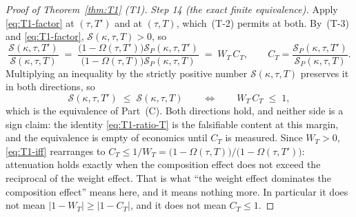 \documentclass[11pt]{article}
\begin{document}
\begin{proof}[Proof of Theorem~\ref{thm:T1} (T1)]
\emph{Step 14 (the exact finite equivalence).} Apply \eqref{eq:T1-factor} at $(\tau,T')$ and at
$(\tau,T)$, which~(T-2) permits at both. By~(T-3) and \eqref{eq:T1-factor},
$\mathcal S(\kappa,\tau,T) > 0$, so
\begin{equation}
\label{eq:T1-ratio-T}
\frac{\mathcal S(\kappa,\tau,T')}{\mathcal S(\kappa,\tau,T)}
\;=\; \frac{\bigl(1-\Omega(\tau,T')\bigr)\mathcal S_P(\kappa,\tau,T')}
            {\bigl(1-\Omega(\tau,T)\bigr)\mathcal S_P(\kappa,\tau,T)}
\;=\; W_T\,C_T,
\qquad
C_T = \frac{\mathcal S_P(\kappa,\tau,T')}{\mathcal S_P(\kappa,\tau,T)} .
\end{equation}
Multiplying an inequality by the strictly positive number $\mathcal S(\kappa,\tau,T)$ preserves it
in both directions, so
\begin{equation}
\label{eq:T1-iff}
\mathcal S(\kappa,\tau,T') \;\le\; \mathcal S(\kappa,\tau,T)
\qquad\Longleftrightarrow\qquad
W_T\,C_T \;\le\; 1 ,
\end{equation}
which is the equivalence of Part~(C). Both directions hold, and neither side is a sign claim: the
identity \eqref{eq:T1-ratio-T} is the falsifiable content at this margin, and the equivalence is
empty of economics until $C_T$ is measured. Since $W_T > 0$, \eqref{eq:T1-iff} rearranges to
$C_T \le 1/W_T = \bigl(1-\Omega(\tau,T)\bigr)/\bigl(1-\Omega(\tau,T')\bigr)$: attenuation holds
exactly when the composition effect does not exceed the reciprocal of the weight effect. That is
what ``the weight effect dominates the composition effect'' means here, and it means nothing more.
In particular it does not mean $\lvert 1-W_T\rvert \ge \lvert 1-C_T\rvert$, and it does not mean
$C_T \le 1$.


\end{proof}
\end{document}
